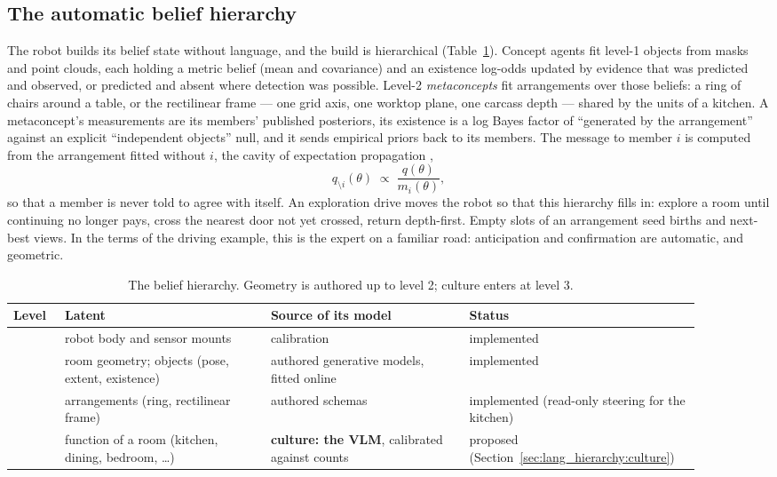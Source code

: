 \subsection{The automatic belief hierarchy}
\label{sec:lang_hierarchy:automatic}

The robot builds its belief state without language, and the build is hierarchical (Table~\ref{tab:lh_levels}).
Concept agents fit level-1 objects from masks and point clouds, each holding a metric belief (mean and covariance)
and an existence log-odds updated by evidence that was predicted and observed, or predicted and absent where
detection was possible. Level-2 \emph{metaconcepts} fit arrangements over those beliefs: a ring of chairs around a
table, or the rectilinear frame --- one grid axis, one worktop plane, one carcass depth --- shared by the units of a
kitchen. A metaconcept's measurements are its members' published posteriors, its existence is a log Bayes factor of
``generated by the arrangement'' against an explicit ``independent objects'' null, and it sends empirical priors
back to its members. The message to member $i$ is computed from the arrangement fitted without $i$, the cavity of
expectation propagation \cite{minka2001expectation},
\begin{equation}
    q_{\setminus i}(\theta) \;\propto\; \frac{q(\theta)}{m_i(\theta)},
    \label{eq:lh_cavity}
\end{equation}
so that a member is never told to agree with itself. An exploration drive moves the robot so that this hierarchy
fills in: explore a room until continuing no longer pays, cross the nearest door not yet crossed, return depth-first.
Empty slots of an arrangement seed births and next-best views. In the terms of the driving example, this is the
expert on a familiar road: anticipation and confirmation are automatic, and geometric.

\begin{table}[ht]
    \centering
    \small
    \begin{tabular}{|>{\raggedright\arraybackslash}p{0.07\linewidth}|>{\raggedright\arraybackslash}p{0.28\linewidth}|>{\raggedright\arraybackslash}p{0.27\linewidth}|>{\raggedright\arraybackslash}p{0.28\linewidth}|}
        \hline
        \textbf{Level} & \textbf{Latent} & \textbf{Source of its model} & \textbf{Status} \\ \hline
        0 & robot body and sensor mounts & calibration & implemented \\ \hline
        1 & room geometry; objects (pose, extent, existence) & authored generative models, fitted online & implemented \\ \hline
        2 & arrangements (ring, rectilinear frame) & authored schemas & implemented (read-only steering for the kitchen) \\ \hline
        3 & function of a room (kitchen, dining, bedroom, \ldots) & \textbf{culture: the VLM}, calibrated against counts & proposed (Section~\ref{sec:lang_hierarchy:culture}) \\ \hline
    \end{tabular}
    \caption{The belief hierarchy. Geometry is authored up to level 2; culture enters at level 3.}
    \label{tab:lh_levels}
\end{table}


